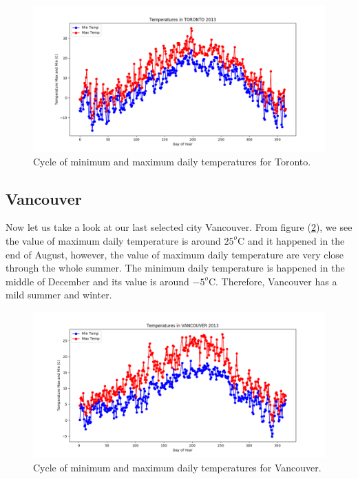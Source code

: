 \documentclass[12pt]{article}
\begin{document}
\begin{center}
\begin{figure}[H]
\includegraphics[width=5.25in]{../Plot/Toronto/day_vs_temp_2013.png}



\caption{Cycle of minimum and maximum daily temperatures for Toronto.}
\label{3}
\end{figure}
\end{center}






\subsection{ \bf Vancouver }
Now let us take a look at our last selected city Vancouver. From figure (\ref{4}), we see the value of maximum daily temperature is around $25^{o}$C and it happened in the end of August, however, the value of maximum daily temperature are very close through the whole summer. The minimum daily temperature is happened in the middle of December and its value is around $-5^{o}$C. Therefore, Vancouver has a mild summer and winter.




\begin{center}
\begin{figure}[H]
\includegraphics[width=5.25in]{../Plot/VANCOUVER/day_vs_temp_2013.png}




\caption{Cycle of minimum and maximum daily temperatures for Vancouver.}
\label{4}
\end{figure}
\end{center}
\end{document}
